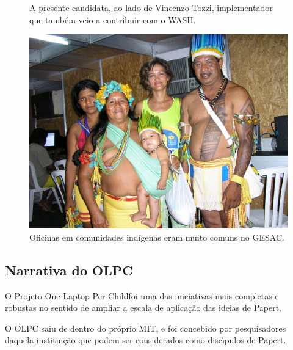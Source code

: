 \documentclass[
12pt,		%
openright,	%
twoside,  %
a4paper,			%
chapter=TITLE,		%
english,			%
french,				%
spanish,			%
brazil				%
]{USPSC-classe/USPSC}
\begin{document}
\begin{figure}[max size={\textwidth}{\textheight}]
\begin{minipage}[b]{0.4\linewidth}
                \caption{A presente candidata, ao lado de Vincenzo Tozzi, implementador que tamb\'em veio a contribuir com o WASH.}
                \label{4459669909728990ef00df4bdb6a369f3449704e}
\end{minipage}
\hspace{0.5cm}
\begin{minipage}[b]{0.4\linewidth}
        \centering
                \includegraphics[width=1.0\linewidth]{../../imagens/povo.JPG}
                \caption{Oficinas em comunidades ind\'{i}genas eram muito comuns no GESAC.}
                \label{50c13a4f82feece9e41db915d8e5bc4c5d5094dd}
\end{minipage}%
\hspace{0.5cm}
\end{figure}



\subsection[Narrativa do OLPC]{Narrativa do OLPC}\label{Narrativa do OLPC}
O Projeto \textquotedbl One Laptop Per Child foi uma das iniciativas mais completas e robustas no sentido de ampliar a escala de aplica\c{c}\~ao das ideias de Papert.










O OLPC saiu de dentro do pr\'oprio MIT, e foi concebido por pesquisadores daquela institui\c{c}\~ao que podem ser considerados como disc\'{\i}pulos de Papert.
\end{document}
